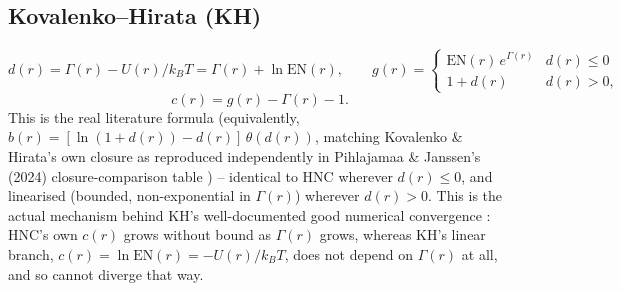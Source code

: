 \documentclass[11pt,a4paper]{article}
\begin{document}
\subsection{Kovalenko--Hirata (KH) \cite{kovalenkohirata1998}}
\label{sec:kh}
\begin{equation}
  d(r) = \Gamma(r) - U(r)/k_BT = \Gamma(r) + \ln\mathrm{EN}(r), \qquad
  g(r) = \begin{cases} \mathrm{EN}(r)\,e^{\Gamma(r)} & d(r)\le0\\ 1+d(r) & d(r)>0, \end{cases}
\end{equation}
\begin{equation}
  c(r) = g(r) - \Gamma(r) - 1.
\end{equation}
This is the real literature formula (equivalently,
$b(r)=[\ln(1+d(r))-d(r)]\,\theta(d(r))$, matching Kovalenko \& Hirata's own
closure \cite{kovalenkohirata1998} as reproduced independently in
Pihlajamaa \& Janssen's (2024) closure-comparison table
\cite{pihlajamaa2024}) -- identical to HNC wherever $d(r)\le0$, and linearised
(bounded, non-exponential in $\Gamma(r)$) wherever $d(r)>0$. This is the
actual mechanism behind KH's well-documented good numerical convergence
\cite{ebato2016}: HNC's own $c(r)$ grows without bound as $\Gamma(r)$
grows, whereas KH's linear branch, $c(r)=\ln\mathrm{EN}(r)=-U(r)/k_BT$,
does not depend on $\Gamma(r)$ at all, and so cannot diverge that way.
\end{document}
